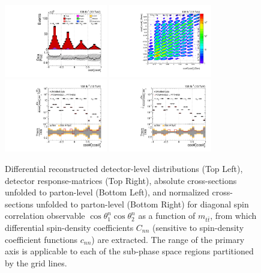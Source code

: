 \clearpage
\begin{figure}[htb]
\begin{center}
 \includegraphics[width=0.40\textwidth]{fig_fullRun2UL/controlplots/combined/Hyp_LLBarCnn_vs_TTBarMass.pdf}
 \includegraphics[width=0.40\textwidth]{fig_fullRun2UL/unfolding/combined/ResponseMatrix_c_nn_mttbar.pdf} \\
 \includegraphics[width=0.40\textwidth]{fig_fullRun2UL/unfolding/combined/UnfoldedResults_c_nn_mttbar.pdf}
 \includegraphics[width=0.40\textwidth]{fig_fullRun2UL/unfolding/combined/UnfoldedResultsNorm_c_nn_mttbar.pdf} \\
\label{fig:c_nn_mttbar}
\caption{Differential reconstructed detector-level distributions (Top Left), detector response-matrices (Top Right), absolute cross-sections unfolded to parton-level (Bottom Left), and normalized cross-sections unfolded to parton-level (Bottom Right) for diagonal spin correlation observable $\cos\theta_{1}^{n}\cos\theta_{2}^{n}$ as a function of $m_{t\bar{t}}$, from which differential spin-density coefficients $C_{nn}$ (sensitive to spin-density coefficient functions $c_{n n}$) are extracted.  The range of the primary axis is applicable to each of the sub-phase space regions partitioned by the grid lines.}
\end{center}
\end{figure}
